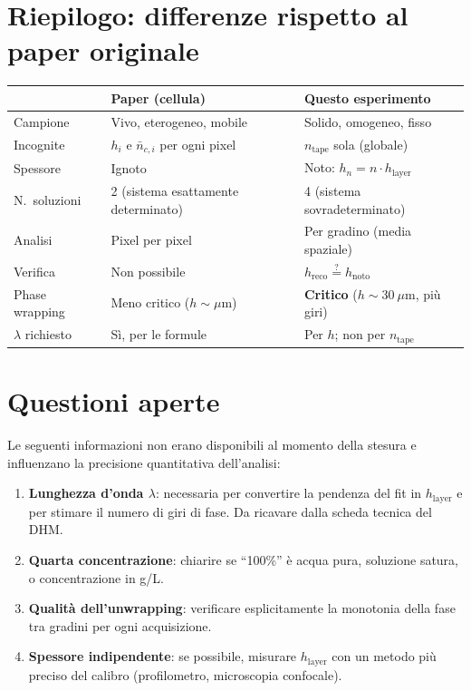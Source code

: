 \section{Riepilogo: differenze rispetto al paper originale}

\begin{center}
\begin{tabular}{p{4.5cm}p{4.5cm}p{4.5cm}}
\hline\hline
& \textbf{Paper (cellula)} & \textbf{Questo esperimento} \\
\hline
Campione & Vivo, eterogeneo, mobile &
  Solido, omogeneo, fisso \\[6pt]
Incognite & $h_i$ e $\bar{n}_{c,i}$ per ogni pixel &
  $n_\text{tape}$ sola (globale) \\[6pt]
Spessore & Ignoto & Noto: $h_n = n\cdot h_\text{layer}$ \\[6pt]
N.\ soluzioni & 2 (sistema esattamente determinato) &
  4 (sistema sovradeterminato) \\[6pt]
Analisi & Pixel per pixel & Per gradino (media spaziale) \\[6pt]
Verifica & Non possibile & $h_\text{reco} \stackrel{?}{=} h_\text{noto}$ \\[6pt]
Phase wrapping & Meno critico ($h \sim \mu\text{m}$) &
  \textbf{Critico} ($h \sim 30\ \mu\text{m}$, più giri) \\[6pt]
$\lambda$ richiesto & Sì, per le formule & Per $h$; non per $n_\text{tape}$ \\
\hline\hline
\end{tabular}
\end{center}

\section{Questioni aperte}

Le seguenti informazioni non erano disponibili al momento della stesura
e influenzano la precisione quantitativa dell'analisi:

\begin{enumerate}
  \item \textbf{Lunghezza d'onda $\lambda$}: necessaria per convertire la
        pendenza del fit in $h_\text{layer}$ e per stimare il numero di giri
        di fase. Da ricavare dalla scheda tecnica del DHM.
  \item \textbf{Quarta concentrazione}: chiarire se ``100\%'' è acqua pura,
        soluzione satura, o concentrazione in g/L.
  \item \textbf{Qualità dell'unwrapping}: verificare esplicitamente la
        monotonia della fase tra gradini per ogni acquisizione.
  \item \textbf{Spessore indipendente}: se possibile, misurare $h_\text{layer}$
        con un metodo più preciso del calibro (profilometro, microscopia confocale).
\end{enumerate}



